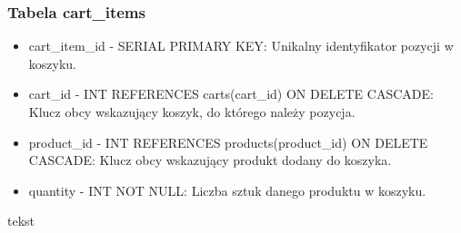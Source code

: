 \subsubsection{Tabela cart\_items}
\begin{itemize}
\item cart\_item\_id - SERIAL PRIMARY KEY: Unikalny identyfikator pozycji w koszyku.
\item cart\_id - INT REFERENCES carts(cart\_id) ON DELETE CASCADE: Klucz obcy wskazujący koszyk, do którego należy pozycja.
\item product\_id - INT REFERENCES products(product\_id) ON DELETE CASCADE: Klucz obcy wskazujący produkt dodany do koszyka.
\item quantity - INT NOT NULL: Liczba sztuk danego produktu w koszyku.
\end{itemize}

tekst